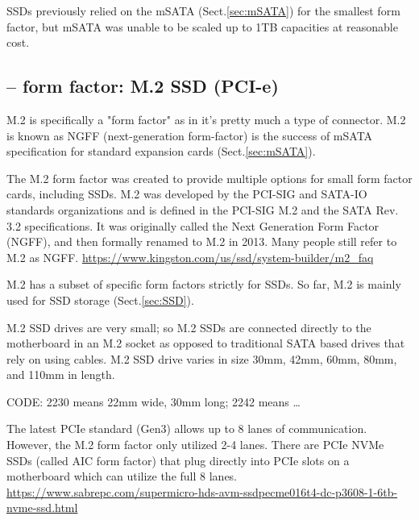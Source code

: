 SSDs previously relied on the mSATA (Sect.\ref{sec:mSATA}) for the smallest form
factor, but mSATA was unable to be scaled up to 1TB capacities at reasonable
cost.

\subsection{-- form factor: M.2 SSD (PCI-e)}
\label{sec:M.2}
\label{sec:NGFF}

\begin{mdframed}


M.2 is specifically a "form factor" as in it's pretty much a type of connector.
M.2 is known as NGFF (next-generation form-factor) is the success of mSATA
specification for standard expansion cards (Sect.\ref{sec:mSATA}). 

The M.2 form factor was created to provide multiple options for small form
factor cards, including SSDs. M.2 was developed by the PCI-SIG and SATA-IO
standards organizations and is defined in the PCI-SIG M.2 and the SATA Rev. 3.2
specifications. It was originally called the Next Generation Form Factor (NGFF),
and then formally renamed to M.2 in 2013. Many people still refer to M.2 as
NGFF. \url{https://www.kingston.com/us/ssd/system-builder/m2_faq}

M.2 has a subset of specific form factors strictly for SSDs.
So far, M.2 is mainly used for SSD storage (Sect.\ref{sec:SSD}).
\end{mdframed}

M.2 SSD drives are very small; so M.2 SSDs are connected directly to the
motherboard in an M.2 socket as opposed to traditional SATA based drives that
rely on using cables. M.2 SSD drive varies in size 30mm, 42mm, 60mm, 80mm, and
110mm in length.



CODE: 2230 means 22mm wide, 30mm long; 2242 means \ldots

The latest PCIe standard (Gen3) allows up to 8 lanes of communication. However,
the M.2 form factor only utilized 2-4 lanes.
There are PCIe NVMe SSDs (called AIC form factor) that plug directly into PCIe
slots on a motherboard which can utilize the full 8 lanes.
\url{https://www.sabrepc.com/supermicro-hds-avm-ssdpecme016t4-dc-p3608-1-6tb-nvme-ssd.html}



